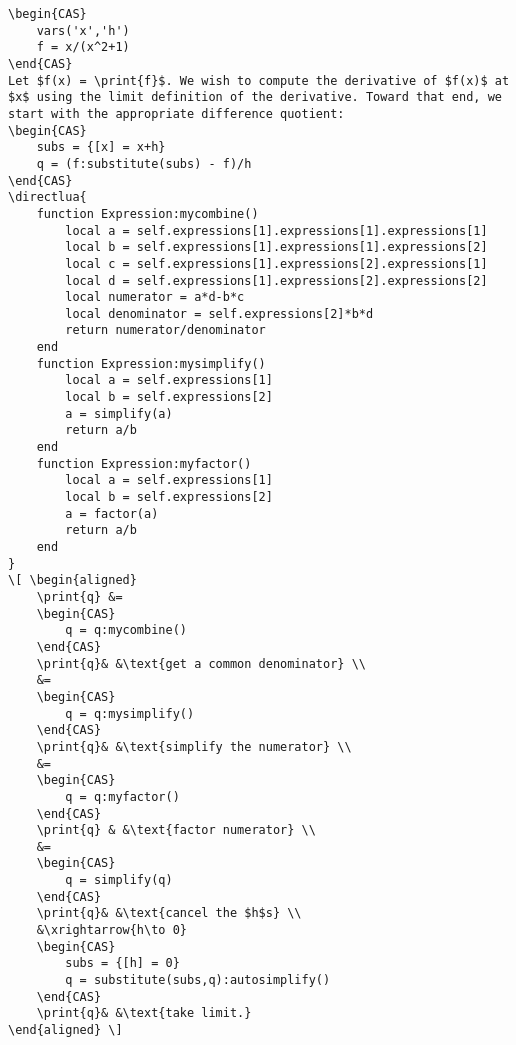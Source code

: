 \documentclass{article}
\begin{document}
\begin{verbatim}
\begin{CAS}
    vars('x','h')
    f = x/(x^2+1)
\end{CAS}
Let $f(x) = \print{f}$. We wish to compute the derivative of $f(x)$ at $x$ using the limit definition of the derivative. Toward that end, we start with the appropriate difference quotient:
\begin{CAS}
    subs = {[x] = x+h}
    q = (f:substitute(subs) - f)/h
\end{CAS}
\directlua{
    function Expression:mycombine()
        local a = self.expressions[1].expressions[1].expressions[1]
        local b = self.expressions[1].expressions[1].expressions[2]
        local c = self.expressions[1].expressions[2].expressions[1]
        local d = self.expressions[1].expressions[2].expressions[2]
        local numerator = a*d-b*c
        local denominator = self.expressions[2]*b*d
        return numerator/denominator
    end
    function Expression:mysimplify()
        local a = self.expressions[1]
        local b = self.expressions[2]
        a = simplify(a)
        return a/b 
    end
    function Expression:myfactor()
        local a = self.expressions[1]
        local b = self.expressions[2]
        a = factor(a)
        return a/b
    end
}
\[ \begin{aligned} 
    \print{q} &=
    \begin{CAS}
        q = q:mycombine()
    \end{CAS}
    \print{q}& &\text{get a common denominator} \\ 
    &= 
    \begin{CAS}
        q = q:mysimplify()
    \end{CAS}
    \print{q}& &\text{simplify the numerator} \\ 
    &= 
    \begin{CAS}
        q = q:myfactor()
    \end{CAS}
    \print{q} & &\text{factor numerator} \\ 
    &=
    \begin{CAS}
        q = simplify(q)
    \end{CAS}
    \print{q}& &\text{cancel the $h$s} \\ 
    &\xrightarrow{h\to 0}
    \begin{CAS}
        subs = {[h] = 0}
        q = substitute(subs,q):autosimplify()
    \end{CAS}
    \print{q}& &\text{take limit.}
\end{aligned} \] 
\end{verbatim}
\end{document}
